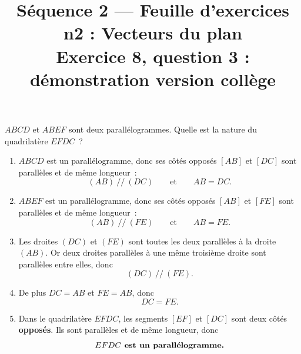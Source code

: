 \documentclass[11pt,a4paper]{article}
\title{\vspace{-1.5cm}\textbf{S\'equence 2 --- Feuille d'exercices n\textdegree{}2 : Vecteurs du plan}\\[4pt]\large Exercice 8, question 3 : d\'emonstration \og version coll\`ege \fg{}}
\author{}
\date{}
\newcommand{\Pt}[1]{\textsf{\small #1}}
\newcommand{\Bandeau}[1]{%
\par\vspace{10pt}
\noindent{\large\color{objorange}\bfseries #1}\par\nobreak
\vspace{2pt}\nobreak
\noindent{\color{gray!45}\rule{\linewidth}{0.6pt}}\par\nobreak
\vspace{4pt}%
}
\begin{document}
\maketitle
\vspace{-1.6cm}

\Bandeau{\'Enonc\'e}

$ABCD$ et $ABEF$ sont deux parall\'elogrammes. Quelle est la nature du quadrilat\`ere $EFDC$~?

\begin{center}
\end{center}

\Bandeau{D\'emonstration}

\begin{enumerate}
\item $ABCD$ est un parall\'elogramme, donc ses c\^ot\'es oppos\'es $[AB]$ et $[DC]$ sont parall\`eles et de m\^eme longueur~:
\[(AB) ~//~(DC) \qquad\text{et}\qquad AB=DC.\]

\item $ABEF$ est un parall\'elogramme, donc ses c\^ot\'es oppos\'es $[AB]$ et $[FE]$ sont parall\`eles et de m\^eme longueur~:
\[(AB) ~//~(FE) \qquad\text{et}\qquad AB=FE.\]

\item Les droites $(DC)$ et $(FE)$ sont toutes les deux parall\`eles \`a la droite $(AB)$. Or deux droites parall\`eles \`a une m\^eme troisi\`eme droite sont parall\`eles entre elles, donc
\[(DC) ~//~(FE).\]

\item De plus $DC=AB$ et $FE=AB$, donc
\[DC=FE.\]

\item Dans le quadrilat\`ere $EFDC$, les segments $[EF]$ et $[DC]$ sont deux c\^ot\'es \textbf{oppos\'es}. Ils sont parall\`eles et de m\^eme longueur, donc
\[\text{\textbf{$EFDC$ est un parall\'elogramme.}}\]
\end{enumerate}
\end{document}
